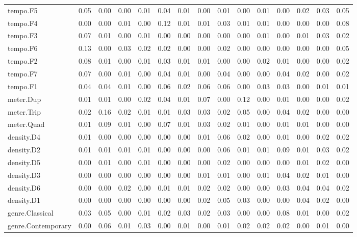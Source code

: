 \documentclass[
]{article}
\newenvironment{lltable}{\begin{landscape}\begin{center}\begin{ThreePartTable}}{\end{ThreePartTable}\end{center}\end{landscape}}
\begin{document}
\begin{lltable}
{\begin{longtable}{lllllllllllllll}
tempo.F5 & 0.05 & 0.00 & 0.00 & 0.01 & 0.04 & 0.01 & 0.00 & 0.01 & 0.00 & 0.01 & 0.00 & 0.02 & 0.03 & 0.05\\
tempo.F4 & 0.00 & 0.00 & 0.01 & 0.00 & 0.12 & 0.01 & 0.01 & 0.03 & 0.01 & 0.01 & 0.00 & 0.00 & 0.00 & 0.08\\
tempo.F3 & 0.07 & 0.01 & 0.00 & 0.01 & 0.00 & 0.00 & 0.00 & 0.00 & 0.00 & 0.01 & 0.00 & 0.01 & 0.03 & 0.02\\
tempo.F6 & 0.13 & 0.00 & 0.03 & 0.02 & 0.02 & 0.00 & 0.00 & 0.02 & 0.00 & 0.00 & 0.00 & 0.00 & 0.00 & 0.05\\
tempo.F2 & 0.08 & 0.01 & 0.00 & 0.01 & 0.03 & 0.01 & 0.01 & 0.00 & 0.00 & 0.02 & 0.01 & 0.00 & 0.00 & 0.02\\
tempo.F7 & 0.07 & 0.00 & 0.01 & 0.00 & 0.04 & 0.01 & 0.00 & 0.04 & 0.00 & 0.00 & 0.04 & 0.02 & 0.00 & 0.02\\
tempo.F1 & 0.04 & 0.04 & 0.01 & 0.00 & 0.06 & 0.02 & 0.06 & 0.06 & 0.00 & 0.03 & 0.03 & 0.00 & 0.01 & 0.01\\
meter.Dup & 0.01 & 0.01 & 0.00 & 0.02 & 0.04 & 0.01 & 0.07 & 0.00 & 0.12 & 0.00 & 0.01 & 0.00 & 0.00 & 0.02\\
meter.Trip & 0.02 & 0.16 & 0.02 & 0.01 & 0.01 & 0.03 & 0.03 & 0.02 & 0.05 & 0.00 & 0.04 & 0.02 & 0.00 & 0.00\\
meter.Quad & 0.01 & 0.09 & 0.01 & 0.00 & 0.07 & 0.01 & 0.03 & 0.02 & 0.01 & 0.00 & 0.01 & 0.01 & 0.00 & 0.00\\
density.D4 & 0.01 & 0.00 & 0.00 & 0.00 & 0.00 & 0.00 & 0.01 & 0.06 & 0.02 & 0.00 & 0.01 & 0.00 & 0.02 & 0.02\\
density.D2 & 0.01 & 0.01 & 0.01 & 0.01 & 0.00 & 0.00 & 0.00 & 0.06 & 0.01 & 0.01 & 0.09 & 0.01 & 0.03 & 0.02\\
density.D5 & 0.00 & 0.01 & 0.00 & 0.01 & 0.00 & 0.00 & 0.00 & 0.02 & 0.00 & 0.00 & 0.00 & 0.01 & 0.02 & 0.00\\
density.D3 & 0.00 & 0.00 & 0.00 & 0.00 & 0.00 & 0.00 & 0.01 & 0.01 & 0.00 & 0.01 & 0.04 & 0.02 & 0.01 & 0.00\\
density.D6 & 0.00 & 0.00 & 0.02 & 0.00 & 0.01 & 0.01 & 0.02 & 0.02 & 0.00 & 0.00 & 0.03 & 0.04 & 0.04 & 0.02\\
density.D1 & 0.00 & 0.00 & 0.00 & 0.00 & 0.00 & 0.00 & 0.02 & 0.05 & 0.03 & 0.00 & 0.00 & 0.04 & 0.02 & 0.00\\
genre.Classical & 0.03 & 0.05 & 0.00 & 0.01 & 0.02 & 0.03 & 0.02 & 0.03 & 0.00 & 0.00 & 0.08 & 0.01 & 0.00 & 0.02\\
genre.Contemporary & 0.00 & 0.06 & 0.01 & 0.03 & 0.00 & 0.01 & 0.00 & 0.01 & 0.02 & 0.02 & 0.02 & 0.00 & 0.01 & 0.00\\

\end{longtable}}
\end{lltable}
\end{document}
